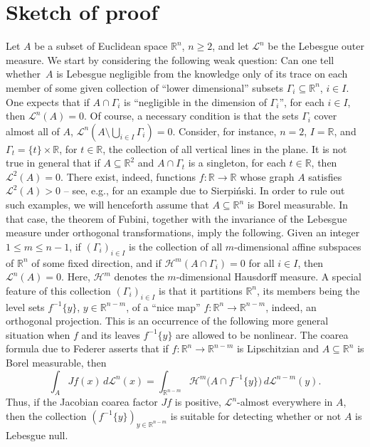 \documentclass[JEP,XML,SOM,Unicode,ThmDefs,NoEqCountersInSection]{cedram}
\newcommand{\R}{\mathbb{R}}
\newcommand{\Rn}{\R^n}
\newcommand{\calH}{\mathscr{H}}
\newcommand{\calL}{\mathscr{L}}
\let\subset\subseteq
\begin{document}
\section{Sketch of proof}
Let $A$ be a subset of Euclidean space $\Rn$, $n \geq 2$, and let $\calL^n$ be the Lebesgue outer measure.
We start by considering the following weak question: Can one tell whether~$A$ is Lebesgue negligible from the knowledge only of its trace on each member of some given collection of ``lower dimensional'' subsets $\Gamma_i \subset \Rn$, $i \in I$.
One expects that if \hbox{$A \cap \Gamma_i$} is ``negligible in the dimension of $\Gamma_i$'', for each $i \in I$, then \hbox{$\calL^n(A)=0$}.
Of course, a necessary condition is that the sets $\Gamma_i$ cover almost all of $A$, \ie \hbox{$\calL^n(A \setminus \bigcup_{i \in I} \Gamma_i)=0$}.
Consider, for instance, $n=2$, $I = \R$, and $\Gamma_t = \{t\} \times \R$, for $t \in \R$, the collection of all vertical lines in the plane.
It is not true in general that if $A \subset \R^2$ and $A \cap \Gamma_t$ is a singleton, for each $t \in \R$, then $\calL^2(A)=0$.
There exist, indeed, functions $f: \R \to \R$ whose graph $A$ satisfies $\calL^2(A) > 0$ -- see, e.g., \cite[Chap.\,2, Th.\,4]{KHARAZISHVILI} for an example due to Sierpi\'nski.
In order to rule out such exam\-ples, we will henceforth assume that $A \subset \Rn$ is Borel measurable.
In that case, the theorem of Fubini, together with the invariance of the Lebesgue measure under orthogonal transformations, imply the following.
Given an integer $1 \leq m \leq n-1$, if $(\Gamma_i)_{i \in I}$ is the collection of all $m$-dimensional affine subspaces of $\Rn$ of some fixed direction, and if $\calH^m(A \cap \Gamma_i)=0$ for all $i \in I$, then $\calL^n(A)=0$.
Here, $\calH^m$ denotes the $m$-dimensional Hausdorff measure.
A special feature of this collection $(\Gamma_i)_{i \in I}$ is that it partitions $\Rn$, its members being the level sets $f^{-1}\{y\}$, $y \in \R^{n-m}$, of a ``nice map'' $f: \Rn \to \R^{n-m}$, indeed, an orthogonal projection.
This is an occurrence of the following more general situation when $f$ and its leaves $f^{-1}\{y\}$ are allowed to be nonlinear.
The coarea formula due to Federer \cite{FED.59} asserts that if $f: \Rn \to \R^{n-m}$ is Lipschitzian and $A \subset \Rn$ is Borel measurable, then
\begin{equation*}
\int_A Jf(x) \,d\calL^n(x) = \int_{\R^{n-m}} \calH^m\bigl(A \cap f^{-1}\{y \}\bigr) \,d\calL^{n-m}(y).
\end{equation*}
Thus, if the Jacobian coarea factor $Jf$ is positive, $\calL^n$-almost everywhere in $A$, then the collection $\left(f^{-1}\{y\} \right)_{y \in \R^{n-m}}$ is suitable for detecting whether or not $A$ is Lebesgue null.
\end{document}
